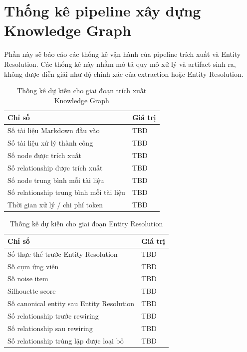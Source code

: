 \section{Thống kê pipeline xây dựng Knowledge Graph}

Phần này sẽ báo cáo các thống kê vận hành của pipeline trích xuất và Entity Resolution. Các thống kê này nhằm mô tả quy mô xử lý và artifact sinh ra, không được diễn giải như độ chính xác của extraction hoặc Entity Resolution.

\begin{table}[H]
\centering
\caption{Thống kê dự kiến cho giai đoạn trích xuất Knowledge Graph}
\label{tab:extraction_stats_placeholder}
\begin{tabularx}{\textwidth}{|p{}|X|}
\hline
\textbf{Chỉ số} & \textbf{Giá trị} \\
\hline
Số tài liệu Markdown đầu vào & TBD \\
\hline
Số tài liệu xử lý thành công & TBD \\
\hline
Số node được trích xuất & TBD \\
\hline
Số relationship được trích xuất & TBD \\
\hline
Số node trung bình mỗi tài liệu & TBD \\
\hline
Số relationship trung bình mỗi tài liệu & TBD \\
\hline
Thời gian xử lý / chi phí token & TBD \\
\hline
\end{tabularx}
\end{table}

\begin{table}[H]
\centering
\caption{Thống kê dự kiến cho giai đoạn Entity Resolution}
\label{tab:er_stats_placeholder}
\begin{tabularx}{\textwidth}{|p{}|X|}
\hline
\textbf{Chỉ số} & \textbf{Giá trị} \\
\hline
Số thực thể trước Entity Resolution & TBD \\
\hline
Số cụm ứng viên & TBD \\
\hline
Số noise item & TBD \\
\hline
Silhouette score & TBD \\
\hline
Số canonical entity sau Entity Resolution & TBD \\
\hline
Số relationship trước rewiring & TBD \\
\hline
Số relationship sau rewiring & TBD \\
\hline
Số relationship trùng lặp được loại bỏ & TBD \\
\hline
\end{tabularx}
\end{table}

